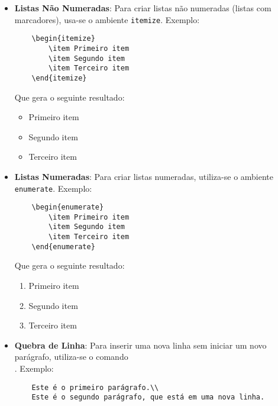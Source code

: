 \begin{itemize}
    \item \textbf{Listas Não Numeradas}: Para criar listas não numeradas (listas com marcadores), usa-se o ambiente \texttt{itemize}. Exemplo:
    \begin{verbatim}
    \begin{itemize}
        \item Primeiro item
        \item Segundo item
        \item Terceiro item
    \end{itemize}
    \end{verbatim}

    Que gera o seguinte resultado:

    \begin{itemize}
        \item Primeiro item
        \item Segundo item
        \item Terceiro item
    \end{itemize}
    
    \item \textbf{Listas Numeradas}: Para criar listas numeradas, utiliza-se o ambiente \texttt{enumerate}. Exemplo:
    \begin{verbatim}
    \begin{enumerate}
        \item Primeiro item
        \item Segundo item
        \item Terceiro item
    \end{enumerate}
    \end{verbatim}

    Que gera o seguinte resultado:

    \begin{enumerate}
        \item Primeiro item
        \item Segundo item
        \item Terceiro item
    \end{enumerate}

    \item \textbf{Quebra de Linha}: Para inserir uma nova linha sem iniciar um novo parágrafo, utiliza-se o comando \texttt{\\}. Exemplo:
    \begin{verbatim}
    Este é o primeiro parágrafo.\\
    Este é o segundo parágrafo, que está em uma nova linha.
    \end{verbatim}


\end{itemize}
